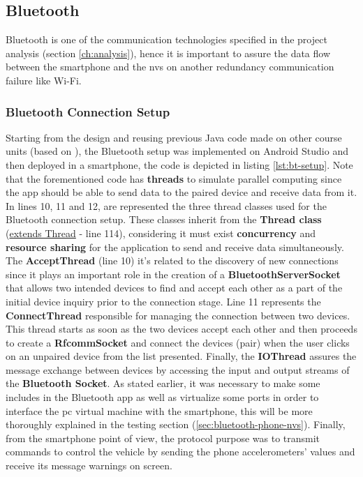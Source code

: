 \subsection{Bluetooth}%
\label{sec:bluetooth-implem}
%
Bluetooth is one of the communication technologies specified in the project analysis (section \ref{ch:analysis}), hence it is important to assure the data flow between the smartphone and the \gls{nvs} on another redundancy communication failure like Wi-Fi. 
%
\subsubsection{Bluetooth Connection Setup}
\label{sec:bluetooth-connection-setup}
Starting from the design and reusing previous Java code made on other course units (based on \cite{btchatsrc}), the Bluetooth setup was implemented on Android Studio and then deployed in a smartphone, the code is depicted in listing \ref{lst:bt-setup}.
%
Note that the forementioned code has \textbf{threads} to simulate parallel computing since the app should be able to send data to the paired device and receive data from it.
%
In lines 10, 11 and 12, are represented the three thread classes used for the Bluetooth connection setup. These classes inherit from the \textbf{Thread class} (\underline{extends Thread} - line 114), considering it must exist \textbf{concurrency} and \textbf{resource sharing} for the application to send and receive data simultaneously. 
%
The \textbf{AcceptThread} (line 10) it's related to the discovery of new connections since it plays an important role in the creation of a \textbf{BluetoothServerSocket} that allows two intended devices to find and accept each other as a part of the initial device inquiry prior to the connection stage. Line 11 represents the \textbf{ConnectThread} responsible for managing the connection between two devices. This thread starts as soon as the two devices accept each other and then proceeds to create a \textbf{RfcommSocket} and connect the devices (pair) when the user clicks on an unpaired device from the list presented. Finally, the \textbf{IOThread} assures the message exchange between devices by accessing the input and output streams of the \textbf{Bluetooth Socket}.
%
As stated earlier, it was necessary to make some includes in the Bluetooth app as well as virtualize some ports in order to interface the \gls{pc} virtual machine with the smartphone, this will be more thoroughly explained in the testing section (\ref{sec:bluetooth-phone-nvs}).
%
Finally, from the smartphone point of view, the protocol purpose was to transmit commands to control the vehicle by sending the phone accelerometers' values and receive its message warnings on screen.\\
%

%


